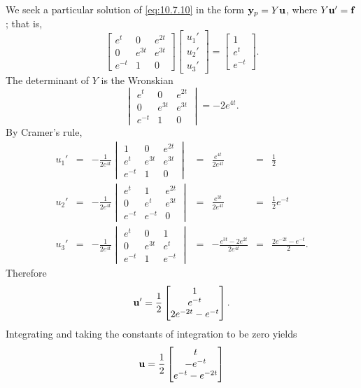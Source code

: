 \documentclass{ximera}
\begin{document}
\begin{example}
\begin{explanation}
We seek a particular solution of  \eqref{eq:10.7.10} in the form
${\bf y}_p=Y{\bf u}$, where $Y{\bf u}'={\bf f}$; that is,
$$
\begin{bmatrix}e^t&0&e^{2t}\\0&e^{3t}&e^{3t}\\e^{-t}&1&0
\end{bmatrix}\begin{bmatrix}u_1'\\u_2'\\u_3'\end{bmatrix}=\begin{bmatrix}1\\e^t\\e^{-t}\end{bmatrix}.
$$
The determinant of $Y$  is the Wronskian
$$
\begin{vmatrix}e^t&0&e^{2t}\\0&e^{3t}&e^{3t}\\e^{-t}&1&0
\end{vmatrix}=-2e^{4t}.
$$
By Cramer's rule,
$$
\begin{array}{ccccccl}
u_1'&=&-\frac{1}{2e^{4t}}\begin{vmatrix}1&0&e^{2t}\\e^t&e^{3t}&e^{3t}
\\e^{-t}&1&0
\end{vmatrix}&=&\frac{e^{4t}}{2e^{4t}}&=&\frac{1}{2}
\\
u_2'&=&-\frac{1}{2e^{4t}}\begin{vmatrix}e^t&1&e^{2t}\\0&e^t&e^{3t}
\\e^{-t}&e^{-t}&0
\end{vmatrix}&=&\frac{e^{3t}}{2e^{4t}}&=&\frac{1}{2}e^{-t}\\
u_3'&=&-\frac{1}{2e^{4t}}\begin{vmatrix}e^t&0&1\\0&e^{3t}&e^t
\\e^{-t}&1&e^{-t}
\end{vmatrix}&=&-\frac{e^{3t}-2e^{2t}}{2e^{4t}}&=&\frac{2e^{-2t}-e^{-t}}{2}.
\end{array}
$$
Therefore
$$
{\bf
u}'=\frac{1}{2}\begin{bmatrix}1\\e^{-t}\\2e^{-2t}-e^{-t}\end{bmatrix}.
$$
Integrating  and taking the constants of integration to be zero yields
$$
{\bf u}=\frac{1}{2}\begin{bmatrix}t\\-e^{-t}\\e^{-t}-e^{-2t}

\end{bmatrix}$$
\end{explanation}
\end{example}
\end{document}
